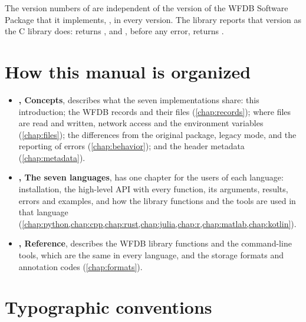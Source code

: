 The version numbers of \wfdbx{} are independent of the version of the WFDB
Software Package that it implements, \wfdbversion{}, in every version. The
library reports that version as the C library does: 
returns , and , before any error, returns
.

\section{How this manual is organized}
\label{sec:organization}

\begin{itemize}
\item \textbf{, Concepts}, describes what the seven
  implementations share: this introduction; the WFDB records and their files
  (\cref{chap:records}); where files are read and written, network access
  and the environment variables (\cref{chap:files}); the differences from
  the original package, legacy mode, and the reporting of errors
  (\cref{chap:behavior}); and the header metadata (\cref{chap:metadata}).
\item \textbf{, The seven languages}, has one chapter
  for the users of each language: installation, the high-level API with
  every function, its arguments, results, errors and examples, and how the
  library functions and the tools are used in that language
  (\cref{chap:python,chap:cpp,chap:rust,chap:julia,chap:r,chap:matlab,chap:kotlin}).
\item \textbf{, Reference}, describes the WFDB library
  functions and the command-line tools, which are the same in every
  language, and the storage formats and annotation codes
  (\cref{chap:formats}).
\end{itemize}

\section{Typographic conventions}
\label{sec:conventions}

